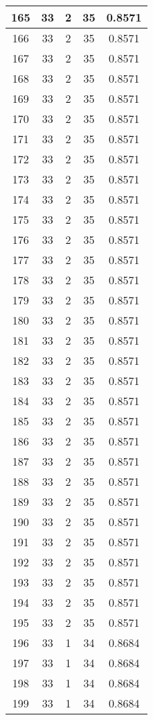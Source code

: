 \documentclass[letterpaper, 12pt]{article}
\begin{document}
\begin{longtable}{|c|c|c|c|c|}
\hline
165 & 33 & 2 & 35 & 0.8571 \\
\hline
166 & 33 & 2 & 35 & 0.8571 \\
\hline
167 & 33 & 2 & 35 & 0.8571 \\
\hline
168 & 33 & 2 & 35 & 0.8571 \\
\hline
169 & 33 & 2 & 35 & 0.8571 \\
\hline
170 & 33 & 2 & 35 & 0.8571 \\
\hline
171 & 33 & 2 & 35 & 0.8571 \\
\hline
172 & 33 & 2 & 35 & 0.8571 \\
\hline
173 & 33 & 2 & 35 & 0.8571 \\
\hline
174 & 33 & 2 & 35 & 0.8571 \\
\hline
175 & 33 & 2 & 35 & 0.8571 \\
\hline
176 & 33 & 2 & 35 & 0.8571 \\
\hline
177 & 33 & 2 & 35 & 0.8571 \\
\hline
178 & 33 & 2 & 35 & 0.8571 \\
\hline
179 & 33 & 2 & 35 & 0.8571 \\
\hline
180 & 33 & 2 & 35 & 0.8571 \\
\hline
181 & 33 & 2 & 35 & 0.8571 \\
\hline
182 & 33 & 2 & 35 & 0.8571 \\
\hline
183 & 33 & 2 & 35 & 0.8571 \\
\hline
184 & 33 & 2 & 35 & 0.8571 \\
\hline
185 & 33 & 2 & 35 & 0.8571 \\
\hline
186 & 33 & 2 & 35 & 0.8571 \\
\hline
187 & 33 & 2 & 35 & 0.8571 \\
\hline
188 & 33 & 2 & 35 & 0.8571 \\
\hline
189 & 33 & 2 & 35 & 0.8571 \\
\hline
190 & 33 & 2 & 35 & 0.8571 \\
\hline
191 & 33 & 2 & 35 & 0.8571 \\
\hline
192 & 33 & 2 & 35 & 0.8571 \\
\hline
193 & 33 & 2 & 35 & 0.8571 \\
\hline
194 & 33 & 2 & 35 & 0.8571 \\
\hline
195 & 33 & 2 & 35 & 0.8571 \\
\hline
196 & 33 & 1 & 34 & 0.8684 \\
\hline
197 & 33 & 1 & 34 & 0.8684 \\
\hline
198 & 33 & 1 & 34 & 0.8684 \\
\hline
199 & 33 & 1 & 34 & 0.8684 \\
\hline
\end{longtable}
\end{document}
